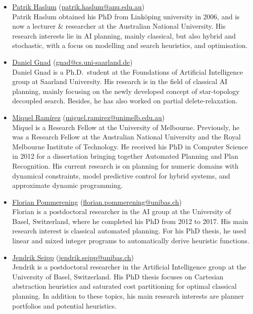 \documentclass[10pt]{article}
\begin{document}
\begin{itemize}

\item \href{https://users.cecs.anu.edu.au/~patrik/}{Patrik Haslum}
(\href{mailto:patrik.haslum@anu.edu.au}{patrik.haslum@anu.edu.au})\\
Patrik Haslum obtained his PhD from Link\"oping university in 2006,
and is now a lecturer \& researcher at the Australian National
University. His research interests lie in AI planning, mainly classical,
but also hybrid and stochastic, with a focus on modelling and search
heuristics, and optimisation.

\item \href{http://}{Daniel Gnad}
(\href{mailto:gnad@cs.uni-saarland.de}{gnad@cs.uni-saarland.de})\\
Daniel Gnad is a Ph.D.\ student at the Foundations of Artificial
Intelligence group at Saarland University. His research is in the field
of classical AI planning, mainly focusing on the newly developed concept
of star-topology decoupled search. Besides, he has also worked on partial
delete-relaxation.

\item \href{http://findanexpert.unimelb.edu.au/display/person778610#tab-overview}{Miquel Ram\'{i}rez}
(\href{mailto:miguel.ramirez@unimelb.edu.au}{miguel.ramirez@unimelb.edu.au})\\
Miquel is a Research Fellow at the University of Melbourne. Previously, he was
a Research Fellow at the Australian National University and the Royal Melbourne
Institute of Technology. He
received his PhD in Computer Science in 2012 for a dissertation
bringing together Automated Planning and Plan Recognition. His current
research is on planning for numeric domains with dynamical constraints, model predictive
control for hybrid systems, and approximate dynamic programming.

 \item \href{http://ai.cs.unibas.ch/people/pommeren}{Florian Pommerening}
   (\href{mailto:florian.pommerening@unibas.ch}{florian.pommerening@unibas.ch})\\
  Florian is a postdoctoral researcher in the AI group at the University of Basel,
  Switzerland, where he completed his PhD from 2012 to 2017. His main
  research interest is classical automated planning. For his PhD
  thesis, he used linear and mixed integer programs to
  automatically derive heuristic functions.

 \item \href{http://ai.cs.unibas.ch/people/seipp}{Jendrik Seipp}
   (\href{mailto:jendrik.seipp@unibas.ch}{jendrik.seipp@unibas.ch})\\
   Jendrik is a postdoctoral researcher in the Artificial Intelligence
   group at the University of Basel, Switzerland. His PhD thesis focuses
   on Cartesian abstraction heuristics and saturated cost partitioning
   for optimal classical planning. In addition to these topics, his main
   research interests are planner portfolios and potential heuristics.


\end{itemize}
\end{document}

